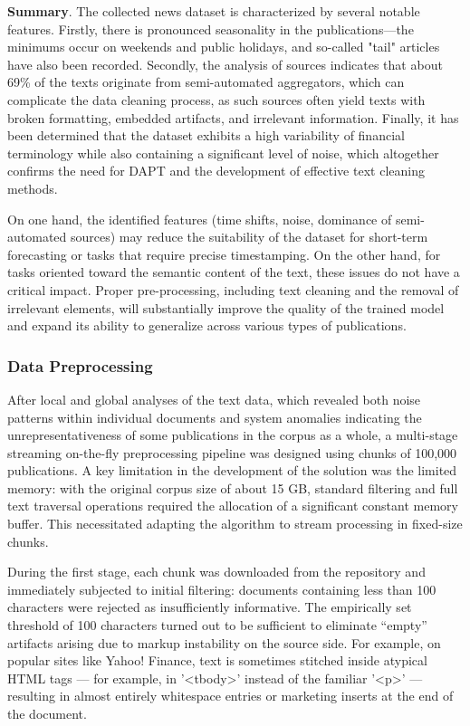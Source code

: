 \textbf{Summary}. The collected news dataset is characterized by several notable features. Firstly, there is pronounced seasonality
in the publications—the minimums occur on weekends and public holidays, and so-called "tail" articles have also been recorded.
Secondly, the analysis of sources indicates that about 69\% of the texts originate from semi-automated aggregators, which can complicate
the data cleaning process, as such sources often yield texts with broken formatting, embedded artifacts, and irrelevant information.
Finally, it has been determined that the dataset exhibits a high variability of financial terminology while also containing a significant
level of noise, which altogether confirms the need for DAPT and the development of effective text cleaning
methods.

On one hand, the identified features (time shifts, noise, dominance of semi-automated sources) may reduce the suitability of the dataset
for short-term forecasting or tasks that require precise timestamping. On the other hand, for tasks oriented toward the semantic content
of the text, these issues do not have a critical impact. Proper pre-processing, including text cleaning and the removal of irrelevant
elements, will substantially improve the quality of the trained model and expand its ability to generalize across various types of publications.

\subsubsection{Data Preprocessing}
\label{sec:data_prep}
After local and global analyses of the text data, which revealed both noise patterns within individual documents and system anomalies
indicating the unrepresentativeness of some publications in the corpus as a whole, a multi-stage streaming on-the-fly preprocessing
pipeline was designed using chunks of 100,000 publications. A key limitation in the development of the solution was the limited
memory: with the original corpus size of about 15 GB, standard filtering and full text traversal operations required the allocation
of a significant constant memory buffer. This necessitated adapting the algorithm to stream processing in fixed-size chunks.

During the first stage, each chunk was downloaded from the repository and immediately subjected to initial filtering: documents
containing less than 100 characters were rejected as insufficiently informative. The empirically set threshold of 100 characters
turned out to be sufficient to eliminate “empty” artifacts arising due to markup instability on the source side. For example,
on popular sites like Yahoo! Finance, text is sometimes stitched inside atypical HTML tags — for example, in '<tbody>' instead
of the familiar '<p>' — resulting in almost entirely whitespace entries or marketing inserts at the end of the document.

